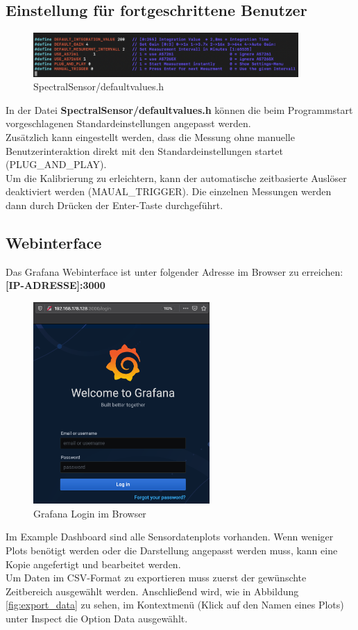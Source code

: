\subsection{Einstellung für fortgeschrittene Benutzer}
 \begin{figure}[H]
\centering
\includegraphics[width=0.9\textwidth]{img/advanced_setting}
\caption{SpectralSensor/defaultvalues.h}
\label{fig:changesettings}
\end{figure}
 In der Datei \textbf{SpectralSensor/defaultvalues.h} können die beim Programmstart vorgeschlagenen Standardeinstellungen angepasst werden.\\
 Zusätzlich kann eingestellt werden, dass die Messung ohne manuelle Benutzerinteraktion direkt mit den Standardeinstellungen startet (PLUG\_AND\_PLAY).\\
 Um die Kalibrierung zu erleichtern, kann der automatische zeitbasierte Auslöser deaktiviert werden (MAUAL\_TRIGGER). Die einzelnen Messungen werden dann durch Drücken der Enter-Taste durchgeführt.
 


\subsection{Webinterface}
Das Grafana Webinterface ist unter folgender Adresse im Browser zu erreichen:\\
\textbf{[IP-ADRESSE]:3000}

\begin{figure}[H]
\centering
\includegraphics[width=0.6\textwidth]{img/handbuch/grafna_login}
\caption{Grafana Login im Browser}
\label{fig:grafna_login}
\end{figure}
\noindent Im Example Dashboard sind alle Sensordatenplots vorhanden. Wenn weniger Plots benötigt werden oder die Darstellung angepasst werden muss, kann eine Kopie angefertigt und bearbeitet werden.\\
Um Daten im CSV-Format zu exportieren muss zuerst der gewünschte Zeitbereich ausgewählt werden.
Anschließend wird, wie in Abbildung \ref{fig:export_data} zu sehen, im Kontextmenü (Klick auf den Namen eines Plots) unter Inspect die Option Data ausgewählt. 

